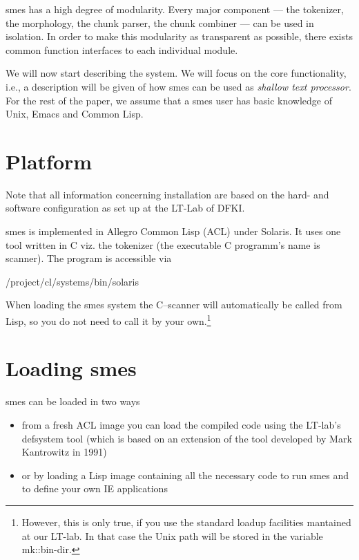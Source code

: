 {\sc smes} has a high degree of modularity. Every major component
--- the tokenizer, the morphology, the chunk parser, the chunk combiner ---
can be used in isolation. In order to make this modularity as
transparent as possible, there exists common function interfaces to
each individual module.

We will now start describing the system. We will focus on the core
functionality, i.e., a description will be given of how {\sc smes}
can be used as {\em shallow text processor}.
For the rest of the paper, we assume that a {\sc smes} user has basic
knowledge of Unix, Emacs and Common Lisp.

\section{Platform}
Note that all information concerning installation are based on the
hard- and software configuration as set up at the LT-Lab of DFKI.

{\sc smes} is implemented in Allegro Common Lisp (ACL) under Solaris.
It uses one tool written in C viz. the tokenizer (the executable C
programm's name is {\sc scanner}). The program is accessible via
\begin{center}
/project/cl/systems/bin/solaris
\end{center}

When loading the {\sc smes} system the C--scanner will automatically
be called from Lisp, so you do not need to call it by your own.\footnote{
However, this is only true, if you use the standard loadup facilities
mantained at our LT-lab. In that case the Unix path will be stored
in the variable {\sc mk::bin-dir}.
}

\section{Loading {\sc smes}}

{\sc smes} can be loaded in two ways
\begin{itemize}
\item   from a fresh ACL image you can load the compiled
        code using the LT-lab's {\sc defsystem} tool
        (which is based on an extension of the tool
        developed by Mark Kantrowitz in 1991)
        
\item   or by loading a Lisp image containing all the necessary
        code to run {\sc smes} and to define your own IE applications
\end{itemize}

